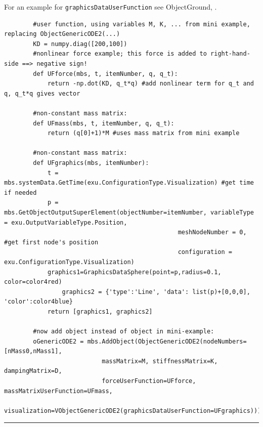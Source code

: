     For an example for \texttt{graphicsDataUserFunction} see ObjectGround, .
    \finishTable
    \userFunctionExample{}
    \pythonstyle\begin{lstlisting}
        #user function, using variables M, K, ... from mini example, replacing ObjectGenericODE2(...)
        KD = numpy.diag([200,100])
        #nonlinear force example; this force is added to right-hand-side ==> negative sign!
        def UFforce(mbs, t, itemNumber, q, q_t): 
            return -np.dot(KD, q_t*q) #add nonlinear term for q_t and q, q_t*q gives vector
        
        #non-constant mass matrix:
        def UFmass(mbs, t, itemNumber, q, q_t): 
            return (q[0]+1)*M #uses mass matrix from mini example
        
        #non-constant mass matrix:
        def UFgraphics(mbs, itemNumber):
            t = mbs.systemData.GetTime(exu.ConfigurationType.Visualization) #get time if needed
            p = mbs.GetObjectOutputSuperElement(objectNumber=itemNumber, variableType = exu.OutputVariableType.Position,
                                                meshNodeNumber = 0, #get first node's position 
                                                configuration = exu.ConfigurationType.Visualization)
            graphics1=GraphicsDataSphere(point=p,radius=0.1, color=color4red)
                graphics2 = {'type':'Line', 'data': list(p)+[0,0,0], 'color':color4blue}
            return [graphics1, graphics2] 

        #now add object instead of object in mini-example:
        oGenericODE2 = mbs.AddObject(ObjectGenericODE2(nodeNumbers=[nMass0,nMass1], 
                           massMatrix=M, stiffnessMatrix=K, dampingMatrix=D,
                           forceUserFunction=UFforce, massMatrixUserFunction=UFmass,
                           visualization=VObjectGenericODE2(graphicsDataUserFunction=UFgraphics)))
    \end{lstlisting}
\vspace{6pt}\par\noindent\rule{\textwidth}{0.4pt}

